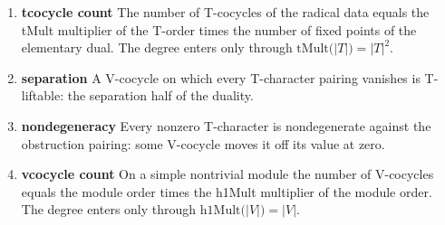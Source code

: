 \begin{enumerate}
\item[(1)] \textbf{tcocycle count} The number of T-cocycles of the radical data equals the tMult multiplier of the T-order times the number of fixed points of the elementary dual. The degree enters only through $\mathrm{tMult}\bigl(\lvert T\rvert\bigr)=\lvert T\rvert^{2}$.
\item[(2)] \textbf{separation} A V-cocycle on which every T-character pairing vanishes is T-liftable: the separation half of the duality.
\item[(3)] \textbf{nondegeneracy} Every nonzero T-character is nondegenerate against the obstruction pairing: some V-cocycle moves it off its value at zero.
\item[(4)] \textbf{vcocycle count} On a simple nontrivial module the number of V-cocycles equals the module order times the h1Mult multiplier of the module order. The degree enters only through $\mathrm{h1Mult}\bigl(\lvert V\rvert\bigr)=\lvert V\rvert$.
\end{enumerate}
